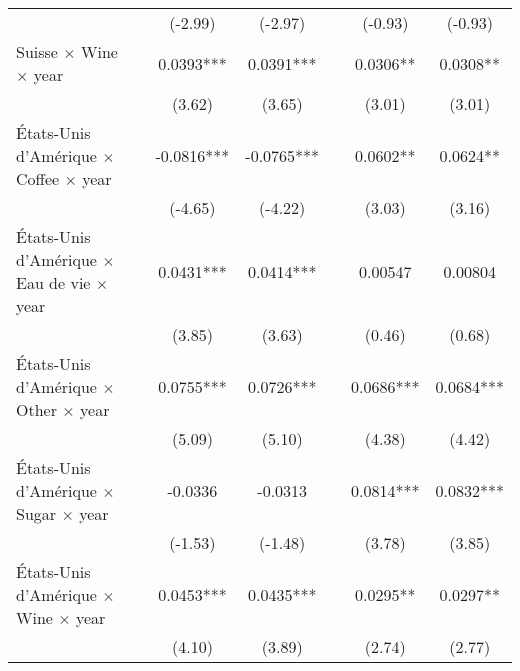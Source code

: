 {\begin{tabular}{l*{6}{c}}
                    &                     &     (-2.99)         &     (-2.97)         &                     &     (-0.93)         &     (-0.93)         \\
[1em]
Suisse $\times$ Wine $\times$ year&                     &      0.0393***&      0.0391***&                     &      0.0306** &      0.0308** \\
                    &                     &      (3.62)         &      (3.65)         &                     &      (3.01)         &      (3.01)         \\
[1em]
États-Unis d'Amérique $\times$ Coffee $\times$ year&                     &     -0.0816***&     -0.0765***&                     &      0.0602** &      0.0624** \\
                    &                     &     (-4.65)         &     (-4.22)         &                     &      (3.03)         &      (3.16)         \\
[1em]
États-Unis d'Amérique $\times$ Eau de vie $\times$ year&                     &      0.0431***&      0.0414***&                     &     0.00547         &     0.00804         \\
                    &                     &      (3.85)         &      (3.63)         &                     &      (0.46)         &      (0.68)         \\
[1em]
États-Unis d'Amérique $\times$ Other $\times$ year&                     &      0.0755***&      0.0726***&                     &      0.0686***&      0.0684***\\
                    &                     &      (5.09)         &      (5.10)         &                     &      (4.38)         &      (4.42)         \\
[1em]
États-Unis d'Amérique $\times$ Sugar $\times$ year&                     &     -0.0336         &     -0.0313         &                     &      0.0814***&      0.0832***\\
                    &                     &     (-1.53)         &     (-1.48)         &                     &      (3.78)         &      (3.85)         \\
[1em]
États-Unis d'Amérique $\times$ Wine $\times$ year&                     &      0.0453***&      0.0435***&                     &      0.0295** &      0.0297** \\
                    &                     &      (4.10)         &      (3.89)         &                     &      (2.74)         &      (2.77)         \\

\end{tabular}}
